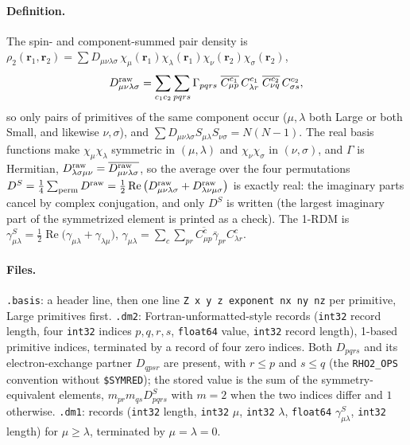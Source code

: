 \documentclass[11pt]{article}
\begin{document}
\paragraph{Definition.} The spin- and component-summed pair density is
$\rho_2(\mathbf r_1,\mathbf r_2)=\sum D_{\mu\nu\lambda\sigma}\,\chi_\mu(\mathbf r_1)\chi_\lambda(\mathbf r_1)\chi_\nu(\mathbf r_2)\chi_\sigma(\mathbf r_2)$,
\begin{equation}
D^{\rm raw}_{\mu\nu\lambda\sigma}=\sum_{c_1c_2}\sum_{pqrs}\Gamma_{pqrs}\;
\overline{C^{c_1}_{\mu p}}\,C^{c_1}_{\lambda r}\;\overline{C^{c_2}_{\nu q}}\,C^{c_2}_{\sigma s},
\end{equation}
so only pairs of primitives of the same component occur ($\mu,\lambda$ both Large or both Small, and likewise
$\nu,\sigma$), and $\sum D_{\mu\nu\lambda\sigma}S_{\mu\lambda}S_{\nu\sigma}=N(N-1)$. The real basis functions make
$\chi_\mu\chi_\lambda$ symmetric in $(\mu,\lambda)$ and $\chi_\nu\chi_\sigma$ in $(\nu,\sigma)$, and $\Gamma$ is Hermitian,
$D^{\rm raw}_{\lambda\sigma\mu\nu}=\overline{D^{\rm raw}_{\mu\nu\lambda\sigma}}$, so the average over the four permutations
$D^S=\tfrac14\sum_{\rm perm}D^{\rm raw}=\tfrac12\operatorname{Re}\big(D^{\rm raw}_{\mu\nu\lambda\sigma}+D^{\rm raw}_{\lambda\nu\mu\sigma}\big)$
is exactly real: the imaginary parts cancel by complex conjugation, and only $D^S$ is written (the largest imaginary part of
the symmetrized element is printed as a check). The 1-RDM is $\gamma^S_{\mu\lambda}=\tfrac12\operatorname{Re}\big(\gamma_{\mu\lambda}+\gamma_{\lambda\mu}\big)$,
$\gamma_{\mu\lambda}=\sum_c\sum_{pr}\overline{C^c_{\mu p}}\bar\gamma_{pr}C^c_{\lambda r}$.

\paragraph{Files.}
\texttt{.basis}: a header line, then one line \texttt{Z x y z exponent nx ny nz} per primitive, Large primitives first.
\texttt{.dm2}: Fortran-unformatted-style records (\texttt{int32} record length, four \texttt{int32} indices $p,q,r,s$,
\texttt{float64} value, \texttt{int32} record length), 1-based primitive indices, terminated by a record of four zero indices.
Both $D_{pqrs}$ and its electron-exchange partner $D_{qpsr}$ are present, with $r\le p$ and $s\le q$ (the
\texttt{RHO2\_OPS} convention without \texttt{\$SYMRED}); the stored value is the sum of the symmetry-equivalent elements,
$m_{pr}m_{qs}D^S_{pqrs}$ with $m=2$ when the two indices differ and $1$ otherwise.
\texttt{.dm1}: records (\texttt{int32} length, \texttt{int32} $\mu$, \texttt{int32} $\lambda$, \texttt{float64}
$\gamma^S_{\mu\lambda}$, \texttt{int32} length) for $\mu\ge\lambda$, terminated by $\mu=\lambda=0$.
\end{document}
